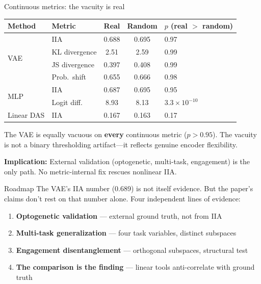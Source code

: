 \documentclass[aspectratio=169,11pt]{beamer}
\begin{document}
\begin{frame}{Continuous metrics: the vacuity is real}
\vspace{0.3em}

\begin{center}
{\scriptsize
\begin{tabular}{llccl}
\toprule
\textbf{Method} & \textbf{Metric} & \textbf{Real} & \textbf{Random} & \textbf{$p$ (real $>$ random)} \\
\midrule
\multirow{4}{*}{VAE} & IIA & 0.688 & 0.695 & 0.97 \\
 & KL divergence & 2.51 & 2.59 & 0.99 \\
 & JS divergence & 0.397 & 0.408 & 0.99 \\
 & Prob.\ shift & 0.655 & 0.666 & 0.98 \\
\midrule
\multirow{2}{*}{MLP} & IIA & 0.687 & 0.695 & 0.95 \\
 & Logit diff. & 8.93 & 8.13 & $3.3 \times 10^{-10}$ \\
\midrule
Linear DAS & IIA & 0.167 & 0.163 & 0.17 \\
\bottomrule
\end{tabular}
}
\end{center}

\vspace{0.5em}

\begin{flushleft}
The VAE is equally vacuous on \textbf{every} continuous metric ($p > 0.95$). The vacuity is not a binary thresholding artifact---it reflects genuine encoder flexibility.

\vspace{0.3em}
{\small \textbf{Implication:} External validation (optogenetic, multi-task, engagement) is the only path. No metric-internal fix rescues nonlinear IIA.}
\end{flushleft}
\end{frame}

\begin{frame}{Roadmap}
\vspace{0.3em}
The VAE's IIA number (0.689) is not itself evidence. But the paper's claims don't rest on that number alone. Four independent lines of evidence:

\vspace{0.5em}
\begin{enumerate}\setlength\itemsep{0.6em}
  \item \textbf{Optogenetic validation} --- external ground truth, not from IIA
  \item \textbf{Multi-task generalization} --- four task variables, distinct subspaces
  \item \textbf{Engagement disentanglement} --- orthogonal subspaces, structural test
  \item \textbf{The comparison is the finding} --- linear tools anti-correlate with ground truth
\end{enumerate}
\end{frame}
\end{document}
